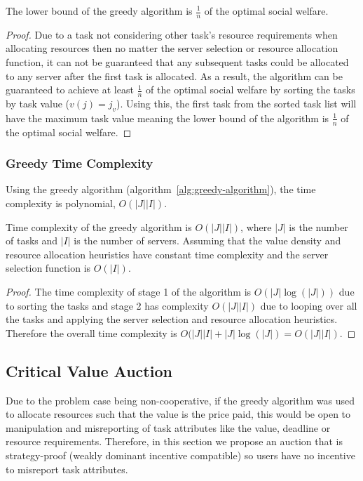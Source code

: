 \begin{theorem}
    The lower bound of the greedy algorithm is $\frac{1}{n}$ of the optimal social welfare.
\end{theorem}
\begin{proof}
    Due to a task not considering other task's resource requirements when allocating resources then no matter the
    server selection or resource allocation function, it can not be guaranteed that any subsequent tasks could be
    allocated to any server after the first task is allocated.
    As a result, the algorithm can be guaranteed to achieve at least $\frac{1}{n}$ of the optimal social
    welfare by sorting the tasks by task value ($v(j) = j_v$). Using this, the first task from the sorted task list
    will have the maximum task value meaning the lower bound of the algorithm is $\frac{1}{n}$ of the optimal social
    welfare.
\end{proof}

\subsubsection{Greedy Time Complexity}
\label{subsubsec:greedy-time-complexity}
Using the greedy algorithm (algorithm~\ref{alg:greedy-algorithm}), the time complexity is polynomial,
$O(\left|J\right| \left|I\right|)$.
\begin{theorem}
    Time complexity of the greedy algorithm is $O(\left|J\right| \left|I\right|)$, where $\left|J\right|$ is the number
    of tasks and $\left|I\right|$ is the number of servers. Assuming that the value density and resource allocation
    heuristics have constant time complexity and the server selection function is $O(\left|I\right|)$.
\end{theorem}
\begin{proof}
    The time complexity of stage 1 of the algorithm is $O(\left|J\right| \log(\left|J\right|))$ due to sorting the
    tasks and stage 2 has complexity $O(\left|J\right| \left|I\right|)$ due to looping over all the tasks and
    applying the server selection and resource allocation heuristics. Therefore the overall time complexity is
    $O(\left|J\right| \left|I\right| + \left|J\right| \log(\left|J\right|) = O(\left|J\right| \left|I\right|)$.
\end{proof}

\subsection{Critical Value Auction}
\label{subsec:critical-value-auction}
Due to the problem case being non-cooperative, if the greedy algorithm was used to allocate resources such that the
value is the price paid, this would be open to manipulation and misreporting of task attributes like the value,
deadline or resource requirements. Therefore, in this section we propose an auction that is strategy-proof
(weakly dominant incentive compatible) so users have no incentive to misreport task attributes.


